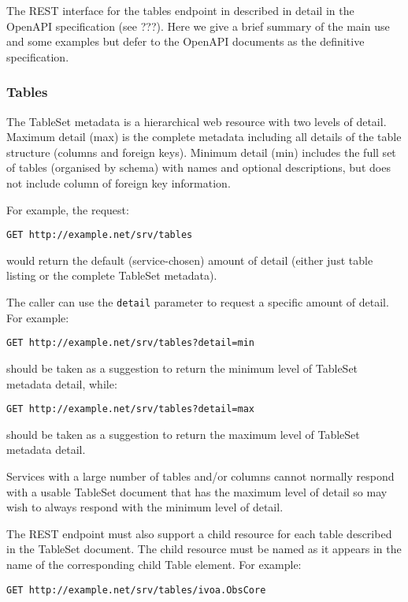 \documentclass[11pt,letter]{ivoa}
\begin{document}
The REST interface for the tables endpoint in described in detail in the OpenAPI
specification (see ???). Here we give a brief summary of the main use and some
examples but defer to the OpenAPI documents as the definitive specification.

\subsubsection{Tables}
The TableSet metadata is a hierarchical web resource with two levels of detail.
Maximum detail (max) is the complete metadata including all details of the table
structure (columns and foreign keys).  Minimum detail (min) includes the full
set of tables (organised by schema) with names and optional descriptions, but does not
include column of foreign key information.

For example, the request:

\begin{verbatim}
GET http://example.net/srv/tables
\end{verbatim}
\noindent would return the default (service-chosen) amount of detail (either just table
listing or the complete TableSet metadata). 

The caller can use the \verb|detail| parameter to request a specific amount of detail.
For example:
\begin{verbatim}
GET http://example.net/srv/tables?detail=min
\end{verbatim}
\noindent should be taken as a suggestion to return the minimum level of TableSet
metadata detail, while:
\begin{verbatim}
GET http://example.net/srv/tables?detail=max
\end{verbatim}
\noindent should be taken as a suggestion to return the maximum level of TableSet
metadata detail.

Services with a large number of tables and/or columns cannot normally
respond with a usable TableSet document that has the maximum level of
detail so may wish to always respond with the minimum level of detail.

The REST endpoint must also support a child resource for each table
described in the TableSet document.  The child resource must be named as
it appears in the name of the corresponding child Table element.  For
example:

\begin{verbatim}
GET http://example.net/srv/tables/ivoa.ObsCore
\end{verbatim}
\end{document}
